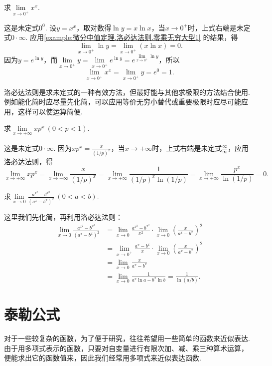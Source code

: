 \begin{example}\label{example:微分中值定理.洛必达法则.零次方零型1}
\def\l{\lim\limits_{x\to0^+}}%
求\(\lim\limits_{x\to0^+}{x^x}\).
\begin{solution}
这是未定式\(0^0\).
设\(y = x^x\)，取对数得\(\ln y = x \ln x\)，当\(x\to0^+\)时，上式右端是未定式\(0\cdot\infty\).
应用\cref{example:微分中值定理.洛必达法则.零乘无穷大型1} 的结果，得\[
\l \ln y = \l (x \ln x) = 0.
\]
因为\(y = e^{\ln y}\)，而\(\l y = \l e^{\ln y} = e^{\l \ln y}\)，所以\[
\l x^x = \l y = e^0 = 1.
\]
\end{solution}
\end{example}

洛必达法则是求未定式的一种有效方法，但最好能与其他求极限的方法结合使用.
例如能化简时应尽量先化简，可以应用等价无穷小替代或重要极限时应尽可能应用，这样可以使运算简便.

\begin{example}\label{example:微分中值定理.洛必达法则.零乘无穷大型2}
\def\l{\lim\limits_{x\to+\infty}}%
求\(\l x p^x\ (0<p<1)\).
\begin{solution}
这是未定式\(0\cdot\infty\).
因为\(x p^x =  \frac{x}{(1/p)^x}\)，当\(x\to+\infty\)时，上式右端是未定式\(\frac{\infty}{\infty}\)，应用洛必达法则，得\[
\l x p^x
= \l \frac{x}{(1/p)^x}
= \l \frac{1}{(1/p)^x \ln(1/p)}
= \l \frac{p^x}{\ln(1/p)}
= 0.
\]
\end{solution}
\end{example}

\begin{example}
\def\l{\lim\limits_{x\to0}}%
求\(\l \frac{a^{x^2}-b^{x^2}}{(a^x-b^x)^2}\ (0<a<b)\).
\begin{solution}
这里我们先化简，再利用洛必达法则：\begin{align*}
\l \frac{a^{x^2}-b^{x^2}}{(a^x-b^x)^2}
&= \l \frac{a^{x^2}-b^{x^2}}{x^2} \cdot \l \left(\frac{x}{a^x-b^x}\right)^2 \\
&= \lim\limits_{x\to0^+} \frac{a^x-b^x}{x} \cdot \l \left(\frac{x}{a^x-b^x}\right)^2 \\
&= \l \frac{x}{a^x-b^x} \\
&= \l \frac{1}{a^x \ln a - b^x \ln b}
= \frac{1}{\ln(a/b)}.
\end{align*}
\end{solution}
\end{example}

\section{泰勒公式}\label{section:微分中值定理.泰勒公式}
对于一些较复杂的函数，为了便于研究，往往希望用一些简单的函数来近似表达.
由于用多项式表示的函数，只要对自变量进行有限次加、减、乘三种算术运算，
便能求出它的函数值来，因此我们经常用多项式来近似表达函数.


